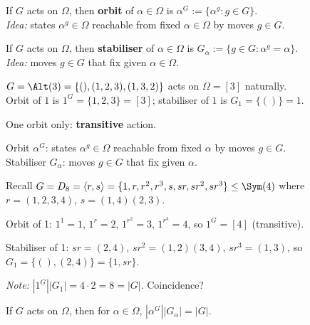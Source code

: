 \begin{slide}
    \begin{definition}[orbit]
        \vspace{0pt}
        If $G$ acts on $\Omega$, then \textbf{orbit} of $\alpha \in \Omega$ is $\alpha^G := \{\alpha^g : g \in G\}$. \\
        \textit{Idea:} states $\alpha^g \in \Omega$ reachable from fixed $\alpha \in \Omega$ by moves $g \in G$. \pause
    \end{definition}

    \begin{definition}[stabiliser]
        \vspace{0pt}
        If $G$ acts on $\Omega$, then \textbf{stabiliser} of $\alpha \in \Omega$ is $G_\alpha := \{g \in G : \alpha^g = \alpha\}$. \\
        \textit{Idea:} moves $g \in G$ that fix given $\alpha \in \Omega$. \pause
    \end{definition}

    \begin{example}
        \vspace{0pt}
        $G = \Alt(3) = \{(),(1,2,3),(1,3,2)\}$ acts on $\Omega = [3]$ naturally. \\
        Orbit of $1$ is \pause $1^G = \{1,2,3\} = [3]$; stabiliser of $1$ is \pause $G_1 = \{()\} = 1$.

        One orbit only: \textbf{transitive} action.
    \end{example}
\end{slide}

\begin{slide}
    Orbit $\alpha^G$: states $\alpha^g \in \Omega$ reachable from fixed $\alpha$ by moves $g \in G$. \\
    Stabiliser $G_\alpha$: moves $g \in G$ that fix given $\alpha$.

    \begin{example}
        \vspace{0pt}
        Recall $G = D_8 = \langle r,s \rangle = \{1,r,r^2,r^3,s,sr,sr^2,sr^3\} \leq \Sym(4)$ where $r = (1,2,3,4)$, $s = (1,4)(2,3)$.

        Orbit of 1: $1^1 = 1$, $1^r = 2$, $1^{r^2} = 3$, $1^{r^3} = 4$, so $1^G = [4]$ (transitive). \pause

        Stabiliser of 1: $sr = (2,4)$, $sr^2 = (1,2)(3,4)$, $sr^3 = (1,3)$, so $G_1 = \{(),(2,4)\} = \{1,sr\}$. \pause

        \textit{Note:} $|1^G||G_1| = 4 \cdot 2 = 8 = |G|$. Coincidence?
    \end{example} \pause

    \begin{theorem}
        \vspace{0pt}
        If $G$ acts on $\Omega$, then for $\alpha \in \Omega$, $|\alpha^G||G_\alpha| = |G|$.
    \end{theorem}
\end{slide}

